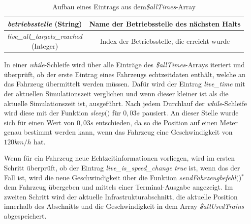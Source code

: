\begin{table}
\begin{center}
\begin{tabular}{c|c}
\textit{betriebsstelle} (String)                  		&    Name der Betriebsstelle des nächsten Halts                \\ \hline
\makecell{\textit{live\_all\_targets\_reached}\\(Integer)}                  		&    Index der Betriebsstelle, die erreicht wurde                \\ 
\end{tabular}
\renewcommand{\arraystretch}{1}
\caption{Aufbau eines Eintrags aus dem\textit{\$allTimes}-Array}
\label{table:aufbauAllTimes}
\end{center}
\end{table}
In einer \textit{while}-Schleife wird über alle Einträge des \textit{\$allTimes}-Arrays iteriert und überprüft, ob der erste Eintrag eines Fahrzeugs \Gls{echtzeitdaten} enthält, welche an das Fahrzeug übermittelt werden müssen. Dafür wird der Eintrag \textit{live\_time} mit der aktuellen Simulationszeit verglichen und wenn dieser kleiner ist als die aktuelle Simulationszeit ist, ausgeführt. Nach jedem Durchlauf der \textit{while}-Schleife wird diese mit der Funktion \textit{sleep$($$)$} für $0,03s$ pausiert. An dieser Stelle wurde sich für einen Wert von $0,03s$ entschieden, da so die Position auf einen Meter genau bestimmt werden kann, wenn das Fahrzeug eine Geschwindigkeit von $120km/h$ hat.

Wenn für ein Fahrzeug neue Echtzeitinformationen vorliegen, wird im ersten Schritt überprüft, ob der Eintrag \textit{live\_is\_speed\_change} \textit{true} ist, wenn das der Fall ist, wird die neue Geschwindigkeit über die Funktion \textit{sendFahrzeugbefehl$($$)$}$^\ast$ dem Fahrzeug übergeben und mittels einer Terminal-Ausgabe angezeigt. Im zweiten Schritt wird der aktuelle Infrastrukturabschnitt, die aktuelle Position innerhalb des Abschnitts und die Geschwindigkeit in dem Array \textit{\$allUsedTrains} abgespeichert. 

